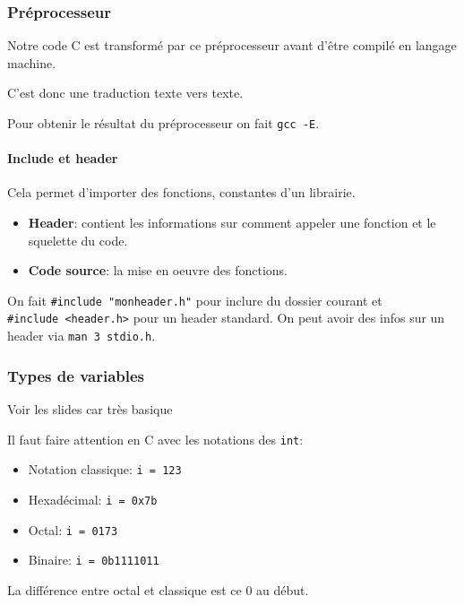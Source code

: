 \subsubsection{Préprocesseur}\label{pruxe9processeur}

Notre code C est transformé par ce préprocesseur avant d'être compilé en
langage machine.

C'est donc une traduction texte vers texte.

Pour obtenir le résultat du préprocesseur on fait \texttt{gcc\ -E}.

\paragraph{Include et header}\label{include-et-header}

Cela permet d'importer des fonctions, constantes d'un librairie.

\begin{itemize}
\tightlist
\item
  \textbf{Header}: contient les informations sur comment appeler une
  fonction et le squelette du code.
\item
  \textbf{Code source}: la mise en oeuvre des fonctions.
\end{itemize}

On fait \texttt{\#include\ "monheader.h"} pour inclure du dossier
courant et \texttt{\#include\ \textless{}header.h\textgreater{}} pour un
header standard. On peut avoir des infos sur un header via
\texttt{man\ 3\ stdio.h}.

\subsubsection{Types de variables}\label{types-de-variables}

Voir les slides car très basique

Il faut faire attention en C avec les notations des \texttt{int}:

\begin{itemize}
\tightlist
\item
  Notation classique: \texttt{i\ =\ 123}
\item
  Hexadécimal: \texttt{i\ =\ 0x7b}
\item
  Octal: \texttt{i\ =\ 0173}
\item
  Binaire: \texttt{i\ =\ 0b1111011}
\end{itemize}

La différence entre octal et classique est ce 0 au début.

